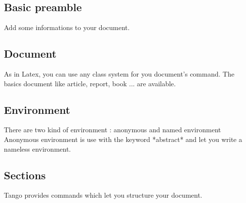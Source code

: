 \subsection{Basic preamble}
Add some informations to your document.

\subsection{Document}
As in Latex, you can use any class system for you document's command.
The basics document like article, report, book ... are available.

\subsection{Environment}
There are two kind of environment : anonymous and named environment
Anonymous environment is use with the keyword *abstract* and let you write a nameless environment.

\code{{{
  \begin{EnvironementA}
  \end{EnvironmentA}

  \begin{abstract}
  \end{abstract}
}}}

\subsection{Sections}
Tango provides commands which let you structure your document.

